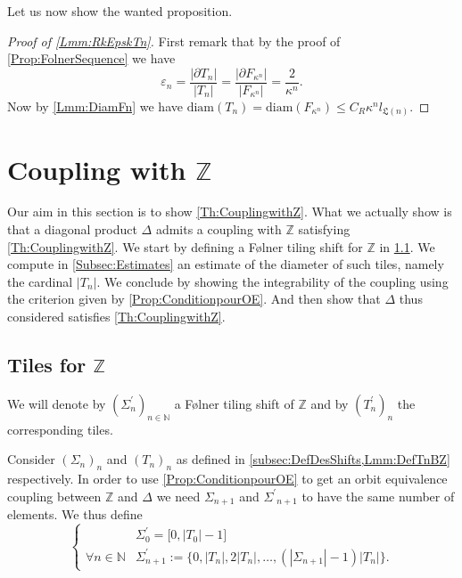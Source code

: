 \documentclass[english, 11pt, a4paper]{article}
\theoremstyle{definition}
\numberwithin{equation}{section}
\newcommand{\bN}{\mathbb{N}}
\newcommand{\bZ}{\mathbb{Z}}
\newcommand{\diam}[1]{\mathrm{diam}\left( {#1} \right)}
\newcommand{\BZ}{\Delta}
\newcommand{\TZ}{T^\prime}
\newcommand{\SZ}{\Sigma^\prime}
\newcommand{\Landing}{\mathfrak{L}}
\newcommand{\Cdiam}{C_R}
\begin{document}
Let us now show the wanted proposition.
\begin{proof}[Proof of \cref{Lmm:RkEpskTn}]
  First remark that by the proof of \cref{Prop:FolnerSequence} we have
  \begin{equation*}
    \varepsilon_n=\frac{|\partial T_n |}{|T_n|} =
    \frac{|\partial F_{\kappa^{n}} |}{|F_{\kappa^{n}}|}= \frac{2}{\kappa^n}.
  \end{equation*}
  Now by \cref{Lmm:DiamFn} we have $\diam{T_n}=\diam{F_{\kappa^n}}\leq \Cdiam
  \kappa^n l_{\Landing(n)}$. 
\end{proof}

\section{\texorpdfstring{Coupling with $\bZ$}{Coupling with the group of
    integers}}\label{Sec:CouplageZ}
Our aim in this section is to show \cref{Th:CouplingwithZ}. 
What we actually show is that a diagonal product $\BZ$ admits a coupling with
$\bZ$ satisfying \cref{Th:CouplingwithZ}. We start by defining a Følner tiling
shift for $\bZ$ in \cref{subsec:TilesZ}. We compute in \cref{Subsec:Estimates}
an estimate of the diameter of such tiles, namely the cardinal $|T_n|$. 
We conclude by showing the integrability of the coupling
using the criterion given by \cref{Prop:ConditionpourOE}. And then show that
$\BZ$ thus considered satisfies \cref{Th:CouplingwithZ}.
\subsection{\texorpdfstring{Tiles for $\bZ$}{Tiles for the integers}}\label{subsec:TilesZ}
We will denote by $(\SZ_n)_{n\in \bN}$ a Følner tiling shift of $\bZ$ and by
$(\TZ_n)_n$ the corresponding tiles. 

Consider $(\Sigma_n)_n$ and $(T_n)_n$ as defined in
\cref{subsec:DefDesShifts,Lmm:DefTnBZ} respectively. In order to use
\cref{Prop:ConditionpourOE} to get an orbit equivalence coupling between $\bZ$
and $\BZ$ we need $\Sigma_{n+1}$ and ${\SZ}_{n+1}$ to have the same number of
elements. We thus define
\begin{equation}\label{eq:TZn}
  \begin{cases}
    &\SZ_0=\big[0,|T_0|-1\big] \\
    \forall n \in \bN &
    \SZ_{n+1}:=\big\{ 0, |T_n|, 2|T_n|, \ldots,
    \left( \left\vert {\Sigma_{n+1}}\right\vert - 1 \right)|T_n|\big\}.
  \end{cases}
\end{equation}
\end{document}
